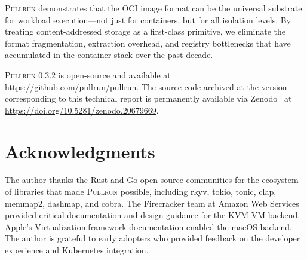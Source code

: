 \documentclass[11pt,a4paper]{article}
\newcommand{\pullrun}{\textsc{Pullrun}}
\begin{document}
\pullrun{} demonstrates that the OCI image format can be the universal substrate for workload execution---not just for containers, but for all isolation levels. By treating content-addressed storage as a first-class primitive, we eliminate the format fragmentation, extraction overhead, and registry bottlenecks that have accumulated in the container stack over the past decade.

\pullrun{} 0.3.2 is open-source and available at \url{https://github.com/pullrun/pullrun}. The source code archived at the version corresponding to this technical report is permanently available via Zenodo~\cite{zenodo} at \url{https://doi.org/10.5281/zenodo.20679669}.

\section*{Acknowledgments}

The author thanks the Rust and Go open-source communities for the ecosystem of libraries that made \pullrun{} possible, including rkyv, tokio, tonic, clap, memmap2, dashmap, and cobra. The Firecracker team at Amazon Web Services provided critical documentation and design guidance for the KVM VM backend. Apple's Virtualization.framework documentation enabled the macOS backend. The author is grateful to early adopters who provided feedback on the developer experience and Kubernetes integration.
\end{document}
